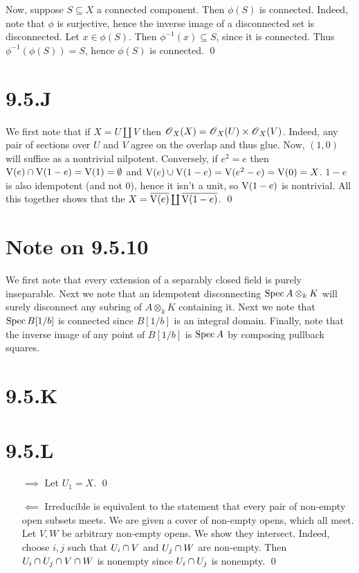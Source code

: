 \documentclass{article}
\begin{document}
Now, suppose $S \subseteq X$ a connected component. Then
$\phi(S)$ is connected. Indeed, note that $\phi$
is surjective, hence the inverse image of a disconnected set is disconnected.
Let $x \in \phi(S)$. Then $\phi^{-1}(x) \subseteq S$, since it is
connected. Thus $\phi^{-1}(\phi(S)) = S$, hence $\phi(S)$ is
connected. \qed

\section{9.5.J}
We first note that if $X=U \coprod V$ then $\operatorname{\mathscr{O}}_X(X)=\operatorname{\mathscr{O}}_X(U) \times \operatorname{\mathscr{O}}_X(V)$.
Indeed, any pair of sections over $U$ and
$V$ agree on the overlap and thus glue. Now,
$(1,0)$ will suffice as a nontrivial nilpotent. Conversely, if
$e^2=e$ then $\operatorname{V}(e) \cap \operatorname{V}(1-e)
    =\operatorname{V}(1)= \emptyset$ and
$\operatorname{V}(e) \cup
    \operatorname{V}(1-e)=\operatorname{V}(e^2-e)=\operatorname{V}(0)=X$. $1-e$ is also idempotent (and not
0), hence it isn't a unit, so $\operatorname{V}(1-e)$ is nontrivial. All this
together shows that the $X=\overline{\operatorname{V}(e)} \coprod \overline{\operatorname{V}(1-e)}$. \qed

\section{Note on 9.5.10}
We first note that every extension of a separably closed field is purely
inseparable. Next we note that an idempotent disconnecting
$\operatorname{Spec} A \otimes_k K$ will surely disconnect any subring of
$A \otimes_k K$ containing it. Next we note that
$\operatorname{Spec} B[1/b]$ is connected since $B[1/b]$ is an
integral domain. Finally, note that the inverse image of any point of
$B[1/b]$ is $\operatorname{Spec} A$ by composing pullback
squares.

\section{9.5.K}

\section{9.5.L}
\begin{itemize}
    \item[$\implies$] Let $U_1=X$. \qed
    \item[$\impliedby$] Irreducible is equivalent to the statement that every
          pair of non-empty open subsets meets. We are given a cover of non-empty opens,
          which all meet. Let $V, W$ be arbitrary non-empty opens. We
          show they intersect. Indeed, choose $i, j$ such that
          $U_i \cap V$ and $U_j \cap W$ are non-empty. Then
          $U_i \cap U_j \cap V \cap W$ is nonempty since $U_i \cap U_j$ is nonempty.
          \qed
\end{itemize}
\end{document}
